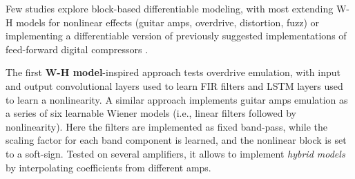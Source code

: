 Few studies explore block-based differentiable modeling, with most extending W-H models for nonlinear effects (guitar amps, overdrive, distortion, fuzz) 
\citep{
kuznetsov2020differentiable, 
nercessian2021lightweight, 
colonel2022reverse, 
miklanek2023neural, 
yeh2024ddsp} 
or implementing a differentiable version
\citep{
lee2024searching, 
yu2024differentiable, 
colonel2022approximating, 
wright2022grey} 
of previously suggested implementations of feed-forward digital compressors 
\cite{zolzer2002dafx, giannoulis2012digital}.

The first \textbf{W-H model}-inspired approach \citep{matsunaga2018digital} tests overdrive emulation, with input and output convolutional layers used to learn FIR filters and LSTM layers used to learn a nonlinearity.
A similar approach \citep{taylor2020latent} implements guitar amps emulation as a series of six learnable Wiener models (i.e., linear filters followed by nonlinearity). 
Here the filters are implemented as fixed band-pass, while the scaling factor for each band component is learned, and the nonlinear block is set to a soft-sign. 
Tested on several amplifiers, it allows to implement \textit{hybrid models} by interpolating coefficients from different amps.

